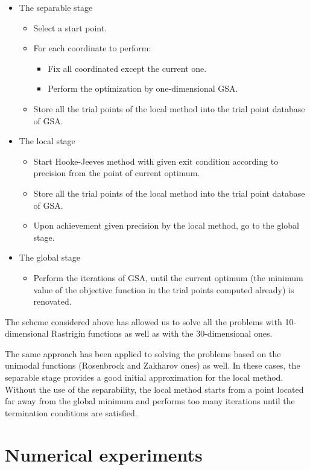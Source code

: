 \documentclass{llncs}
\begin{document}
\begin{itemize}
	\item The separable stage 
	\begin{itemize}
		\item Select a start point.
		\item For each coordinate to perform:
		\begin{itemize}
			\item Fix all coordinated except the current one.
			\item Perform the optimization by one-dimensional GSA. 
		\end{itemize}
		\item Store all the trial points of the local method into the trial point database of GSA.		
	\end{itemize}
	\item The local stage 
	\begin{itemize}
		\item Start Hooke-Jeeves method with given exit condition according to precision from the point of current optimum.
		\item Store all the trial points of the local method into the trial point database of GSA.
		\item Upon achievement given precision by the local method, go to the global stage.
	\end{itemize}
\item The global stage
	\begin{itemize}
		\item Perform the iterations of GSA, until the current optimum (the minimum value of the objective function in the trial points computed already) is renovated.
	\end{itemize}	
\end{itemize}

The scheme considered above has allowed us to solve all the problems with 10-dimensional Rastrigin functions as well as with the 30-dimensional ones.

The same approach has been applied to solving the problems based on the unimodal functions (Rosenbrock and Zakharov ones) as well. In these cases, the separable stage provides a good initial approximation for the local method. Without the use of the separability, the local method starts from a point located far away from the global minimum and performs too many iterations until the termination conditions are satisfied. 

\section{Numerical experiments}\label{sec:5}
\end{document}
